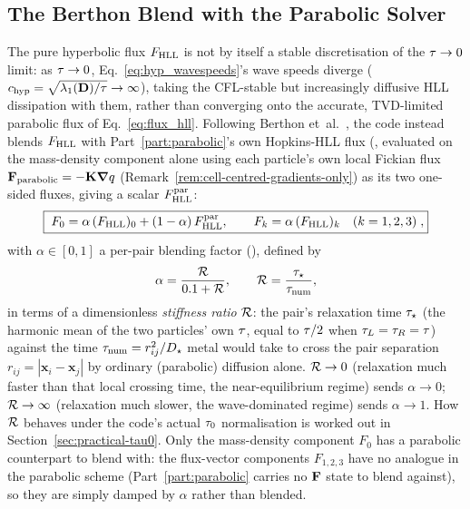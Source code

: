 \subsection{The Berthon Blend with the Parabolic Solver}
\label{sec:berthon-blend}
The pure hyperbolic flux $F_{\rm HLL}$ is not by itself a stable
discretisation of the $\tau\to0$ limit: as $\tau\to0$,
Eq.~\eqref{eq:hyp_wavespeeds}'s wave speeds diverge
($c_{\rm hyp}=\sqrt{\lambda_1(\mathbf{D})/\tau}\to\infty$), taking the
CFL-stable but increasingly diffusive HLL dissipation with them, rather
than converging onto the accurate, TVD-limited parabolic flux of
Eq.~\eqref{eq:flux_hll}. Following Berthon
et~al.~\citeyear{Berthon2007}, the code instead blends $F_{\rm HLL}$ with
Part~\ref{part:parabolic}'s own Hopkins-HLL flux
(, evaluated on the
mass-density component alone using each particle's own local Fickian
flux $\mathbf{F}_{\rm parabolic}=-\mathbf{K}\grad q$
(Remark~\ref{rem:cell-centred-gradients-only}) as its two one-sided
fluxes, giving a scalar $F_{\rm HLL}^{\rm par}$:
\begin{equation}
  \label{eq:berthon_blend}
  \boxed{\;
  F_0 = \alpha\, (F_{\rm HLL})_0 + (1-\alpha)\, F_{\rm HLL}^{\rm par} ,
  \qquad
  F_k = \alpha\, (F_{\rm HLL})_k \quad (k=1,2,3) \; ,}
\end{equation}
with $\alpha\in[0,1]$ a per-pair blending factor
(), defined by
\begin{equation}
  \label{eq:berthon_alpha}
  \alpha = \frac{\mathcal{R}}{0.1+\mathcal{R}} ,
  \qquad \mathcal{R} = \frac{\tau_\star}{\tau_{\rm num}} ,
\end{equation}
in terms of a dimensionless \emph{stiffness ratio} $\mathcal{R}$: the pair's
relaxation time $\tau_\star$ (the harmonic mean of the two
particles' own $\tau$, equal to $\tau/2$ when
$\tau_L=\tau_R=\tau$) against the time
$\tau_{\rm num}=r_{ij}^2/D_\star$ metal would take to cross the pair
separation $r_{ij}=|\mathbf x_i-\mathbf x_j|$ by ordinary (parabolic)
diffusion alone. $\mathcal{R}\to0$ (relaxation much faster than that local
crossing time, the near-equilibrium regime) sends $\alpha\to0$;
$\mathcal{R}\to\infty$ (relaxation much slower, the wave-dominated regime)
sends $\alpha\to1$. How $\mathcal{R}$ behaves under the code's actual
$\tau_0$ normalisation is worked out in
Section~\ref{sec:practical-tau0}. Only the mass-density
component $F_0$ has a parabolic counterpart to blend with: the
flux-vector components $F_{1,2,3}$ have no analogue in the parabolic
scheme (Part~\ref{part:parabolic} carries no $\mathbf{F}$ state to blend
against), so they are simply damped by $\alpha$ rather than blended.

